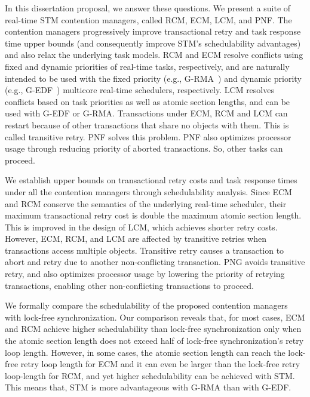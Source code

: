 In this dissertation proposal, we answer these questions. We present a suite of real-time STM contention managers, called RCM, ECM, LCM, and PNF. The contention managers progressively improve transactional retry and task response time upper  bounds (and consequently improve STM's schedulability advantages) and also relax the underlying task models. RCM and ECM resolve conflicts using fixed and dynamic priorities of real-time tasks, respectively, and are naturally intended to be used with the fixed priority (e.g., G-RMA~\cite{buttazzo2005hard}) and dynamic priority (e.g., G-EDF~\cite{buttazzo2005hard}) multicore real-time schedulers, respectively. LCM resolves conflicts based on task priorities as well as atomic section lengths, and can be used with G-EDF or G-RMA. Transactions under ECM, RCM and LCM can restart because of other transactions that share no objects with them. This is called transitive retry. PNF solves this problem. PNF also optimizes processor usage through reducing priority of aborted transactions. So, other tasks can proceed.

We establish upper bounds on transactional retry costs and task response times under all the contention managers through schedulability analysis.   Since ECM and RCM conserve the semantics of the underlying real-time scheduler, their maximum transactional retry cost is double the maximum atomic section length. This is improved in the design of LCM, which achieves  shorter retry costs.  However, ECM, RCM, and LCM are affected by transitive retries when transactions access multiple objects. 
Transitive retry causes a transaction to abort and retry due to another non-conflicting transaction. PNG avoids transitive retry, and also optimizes processor usage by lowering the priority of retrying transactions, enabling other non-conflicting transactions to proceed. 

We formally compare the schedulability of the proposed contention managers with lock-free synchronization. 
Our comparison reveals that, for most cases, ECM and RCM achieve higher schedulability than lock-free synchronization only when the atomic section length does not exceed half of lock-free synchronization's retry loop length. However, in some cases, the atomic section length can reach the lock-free retry loop length for ECM and it can even be larger than the lock-free retry loop-length for RCM, and yet higher schedulability can be achieved with STM. This means that, STM is more advantageous with G-RMA than with G-EDF. 

